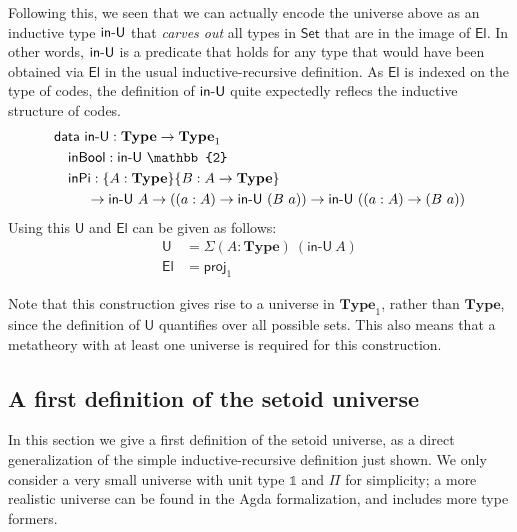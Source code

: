 \documentclass{easychair}
\newcommand{\ad}[1]{\AgdaFunction{#1}}
\newcommand{\Set}{\textsf{Set}}
\newcommand{\mType}{\mathbf{Type}}
\newcommand{\U}{\textsf{U}}
\newcommand{\El}{\textsf{El}}
\providecommand\mathbbm{\mathbb}
\begin{document}
Following this, we seen that we can actually encode the universe above as an
inductive type $\ad{in-U}$ that \emph{carves out} all types in $\Set$ that are
in the image of $\El$. In other words, $\ad{in-U}$ is a predicate that holds for
any type that would have been obtained via $\El$ in the usual
inductive-recursive definition. As $\El$ is indexed on the type of codes, the
definition of $\ad{in-U}$ quite expectedly reflecs the inductive structure of
codes.
%
\begin{align*}
  & \textsf{data}\ \ad{in-U} : \mType \to \mType_1 \\
  & \quad \textsf{inBool} : \textsf{in-U}\ \mathbbm{2} \\
  & \quad \textsf{inPi}
  :  \{A : \mType\} \{B : A \to \mType\}\\
  & \ \qquad \to \ad{in-U}\ A
  \to ((a : A) \to \ad{in-U}\ (B\ a))
  \to \ad{in-U}\ ((a : A) \to (B\ a))
\end{align*}
Using this $\U$ and $\El$ can be given as follows:
\begin{align*}
  \U & = \Sigma (A : \mType)\ (\textsf{in-U}\ A) \\
  \El & = \textsf{proj}_1
\end{align*}

Note that this construction gives rise to a universe in $\mType_1$, rather than
$\mType$, since the definition of $\U$ quantifies over all possible sets. This
also means that a metatheory with at least one universe is required for this
construction.

\subsection{A first definition of the setoid universe}\label{ir-setoid-universe}

In this section we give a first definition of the setoid universe, as a direct
generalization of the simple inductive-recursive definition just shown. We only
consider a very small universe with unit type $\mathds{1}$ and $\Pi$ for
simplicity; a more realistic universe can be found in the Agda formalization,
and includes more type formers.
\end{document}
